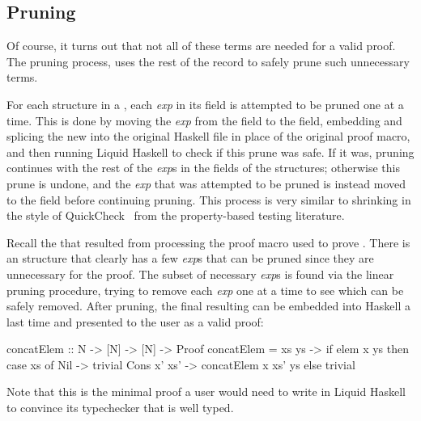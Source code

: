 \subsection{Pruning}
\label{sec:prune}


Of course, it turns out that not all of these terms are needed for a
valid proof. The pruning process, uses the rest of the 
record to safely prune such unnecessary terms.

For each  structure in a \LangBTerm, each \textit{exp} in its  field is attempted to be pruned one at a time.
This is done by moving the \textit{exp} from the  field to the  field, embedding and splicing the new \LangBTerm into the original Haskell file in place of the original proof macro, and then running Liquid Haskell to check if this prune was safe.
If it was, pruning continues with the rest of the \textit{exp}s in the  fields of the  structures; otherwise this prune is undone, and the \textit{exp} that was attempted to be pruned is instead moved to the  field before continuing pruning.
%
This process is very similar to shrinking in the style of
QuickCheck~\cite{ClaessenH00} from the property-based testing
literature.

Recall the \LangBTerm that resulted from processing the proof macro used to prove .
There is an  structure that clearly has a few \textit{exp}s that can be pruned since they are unnecessary for the proof.
The subset of necessary \textit{exp}s is found via the linear pruning procedure, trying to remove each \textit{exp} one at a time to see which can be safely removed.
After pruning, the final resulting \LangBTerm can be embedded into Haskell a last time and presented to the user as a valid proof:

\begin{code}
  concatElem :: N -> [N] -> [N] -> Proof
  concatElem = \x xs ys ->
    if elem x ys then
      case xs of
        Nil -> trivial
        Cons x' xs' -> concatElem x xs' ys
    else
      trivial
\end{code}
%
Note that this is the minimal proof a user would need to write
in Liquid Haskell to convince its typechecker that 
is well typed.



